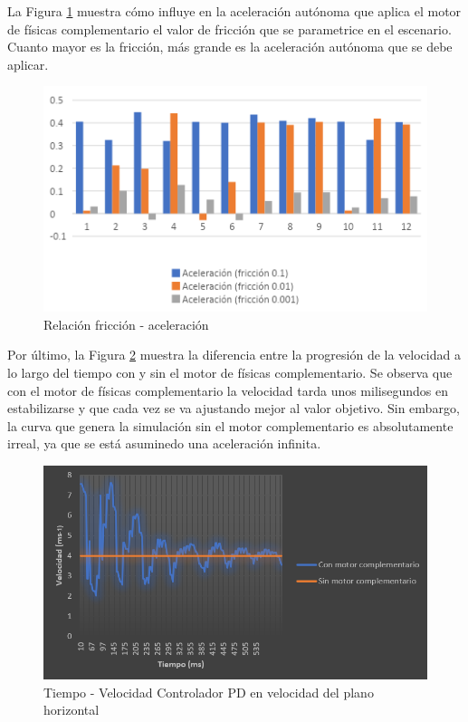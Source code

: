 La Figura \ref{fig:friccion-acele} muestra cómo influye en la aceleración autónoma que aplica el motor de físicas complementario el valor de fricción que se parametrice en el escenario. Cuanto mayor es la fricción, más grande es la aceleración autónoma que se debe aplicar.
\newpage
\begin{figure}[h!]
    \centering
    \includegraphics[scale=0.8]{aceleracion-friccion.png}
    \caption{Relación fricción - aceleración}
    \label{fig:friccion-acele}
\end{figure}

Por último, la Figura \ref{fig:vel-planoXZ} muestra la diferencia entre la progresión de la velocidad a lo largo del tiempo con y sin el motor de físicas complementario. Se observa que con el motor de físicas complementario la velocidad tarda unos milisegundos en estabilizarse y que cada vez se va ajustando mejor al valor objetivo. Sin embargo, la curva que genera la simulación sin el motor complementario es absolutamente irreal, ya que se está asuminedo una aceleración infinita.

\begin{figure}[h!]
    \centering
    \includegraphics[scale=0.8]{PD_vel_XZ.PNG}
    \caption{Tiempo - Velocidad Controlador PD en velocidad del plano horizontal}
    \label{fig:vel-planoXZ}
\end{figure}

